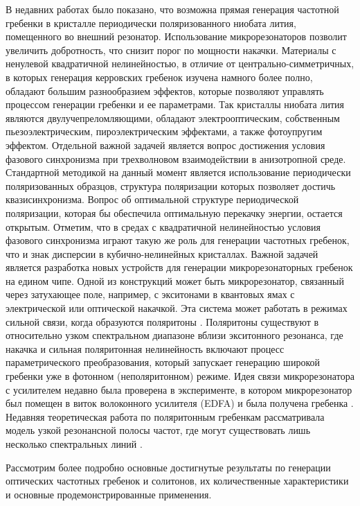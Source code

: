 В недавних работах было показано, что возможна прямая генерация частотной гребенки в кристалле периодически поляризованного ниобата лития, помещенного во внешний резонатор. Использование микрорезонаторов позволит увеличить добротность, что снизит порог по мощности накачки. Материалы с ненулевой квадратичной нелинейностью, в отличие от центрально-симметричных, в которых генерация керровских гребенок изучена намного более полно, обладают большим разнообразием эффектов, которые позволяют управлять процессом генерации гребенки и ее параметрами. Так кристаллы ниобата лития являются двулучепреломляющими, обладают электрооптическим, собственным пьезоэлектрическим, пироэлектрическим эффектами, а также фотоупругим эффектом. Отдельной важной задачей является вопрос достижения условия фазового синхронизма при трехволновом взаимодействии в анизотропной среде. Стандартной методикой на данный момент является использование периодически поляризованных образцов, структура поляризации которых позволяет достичь квазисинхронизма. Вопрос об оптимальной структуре периодической поляризации, которая бы обеспечила оптимальную перекачку энергии, остается открытым. Отметим, что в средах с квадратичной нелинейностью условия фазового синхронизма играют такую же роль для генерации частотных гребенок, что и знак дисперсии в кубично-нелинейных кристаллах.
Важной задачей является разработка новых устройств для генерации микрорезонаторных гребенок на едином чипе. Одной из конструкций может быть микрорезонатор, связанный через затухающее поле, например, с экситонами в квантовых ямах с электрической или оптической накачкой. Эта система может работать в режимах сильной связи, когда образуются поляритоны \cite{Schneider2013}. Поляритоны существуют в относительно узком спектральном диапазоне вблизи экситонного резонанса, где накачка и сильная поляритонная нелинейность включают процесс параметрического преобразования, который запускает генерацию широкой гребенки уже в фотонном (неполяритонном) режиме. Идея связи микрорезонатора с усилителем недавно была проверена в эксперименте, в котором микрорезонатор был помещен в виток волоконного усилителя (EDFA) и была получена гребенка \cite{Johnson2014}. Недавняя теоретическая работа по поляритонным гребенкам рассматривала модель узкой резонансной полосы частот, где могут существовать лишь несколько спектральных линий \cite{Rayanov2015}.


Рассмотрим более подробно основные достигнутые результаты по генерации оптических частотных гребенок и солитонов, их количественные характеристики и основные продемонстрированные применения.

